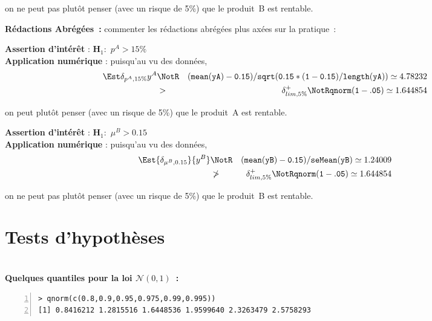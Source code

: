 \documentclass[10pt]{report}
\begin{document}
\begin{exercice}
on ne peut pas plutôt penser (avec un risque de 5\%) que le produit~B est rentable.

\noindent \textbf{Rédactions Abrégées~:} commenter les rédactions abrégées plus axées sur la pratique~:

\noindent {}\hrulefill

\noindent \textbf{Assertion d'intérêt} :  $\mathbf{H}_1:$ $p^{A}>15\%$ \\
\textbf{Application numérique} :  puisqu'au vu des données, 
  \begin{eqnarray*}
\Est{\delta_{p^{A},15\%}}{y^{A}} &\NotR&\mathtt{(mean(yA)-0.15)/sqrt(0.15*(1-0.15)/length(yA))}\simeq 4.78232\\& >  & \delta^+_{lim,5\%} \NotR \mathtt{qnorm(1-.05)}\simeq1.644854
\end{eqnarray*}
  
on peut plutôt penser (avec un risque de 5\%) que le produit~A est rentable.

\noindent {}\hrulefill

\noindent \textbf{Assertion d'intérêt} :  $\mathbf{H}_1:$ $\mu^{B}>0.15$ \\
\textbf{Application numérique} :  puisqu'au vu des données, 
  \begin{eqnarray*}
\Est{\delta_{\mu^{B},0.15}}{y^{B}} &\NotR&\mathtt{(mean(yB)-0.15)/seMean(yB)}\simeq 1.24009\\&\ngtr & \delta^+_{lim,5\%} \NotR \mathtt{qnorm(1-.05)}\simeq1.644854
\end{eqnarray*}
  
on ne peut pas plutôt penser (avec un risque de 5\%) que le produit~B est rentable.
\end{exercice}

\chapter{Tests d'hypothèses}\label{TdHypo}
\noindent {}\\

\noindent \textbf{Quelques quantiles pour la loi $\mathcal{N}(0,1)$~:}
\begin{Verbatim}[frame=leftline,fontfamily=tt,fontshape=n,numbers=left]
> qnorm(c(0.8,0.9,0.95,0.975,0.99,0.995))
[1] 0.8416212 1.2815516 1.6448536 1.9599640 2.3263479 2.5758293
\end{Verbatim}
\end{document}
